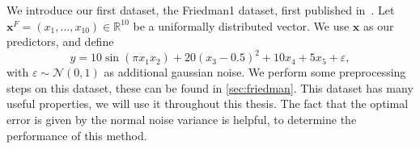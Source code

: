 We introduce our first dataset, the Friedman1 dataset, first published
in~\cite{datasets-friedman}.
Let \(\bm{x}^F = (x_1, \ldots, x_{10}) \in \mathbb{R}^{10}\) be a uniformally distributed vector.
We use \(\bm{x}\) as our predictors, and define
\begin{equation}\label{eq:friedman1}
  y = 10 \sin(\pi x_1 x_2) + 20(x_3 - 0.5)^2 + 10x_4 + 5x_5 + \varepsilon,
\end{equation}
with \(\varepsilon \sim \mathcal{N}(0,1)\) as additional gaussian noise.
We perform some preprocessing steps on this dataset, these can be found in \cref{sec:friedman}.
This dataset has many useful properties, we will use it throughout this thesis.
The fact that the optimal error is given by the normal noise variance is
helpful, to determine the performance of this method.


